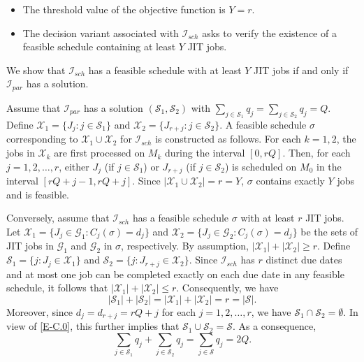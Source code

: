 \documentclass[12pt, eqno, limlimits]{article}
\begin{document}
\begin{sloppypar}
\begin{itemize}
            \item The threshold value of the objective function is $Y=r$.
            
            \item The decision variant associated with $\mathcal{I}_{sch}$ asks to verify the existence of a feasible schedule containing at least $Y$ JIT jobs.
        \end{itemize}
        
        We show that $\mathcal{I}_{sch}$ has a feasible schedule with at least $Y$ JIT jobs if and only if $\mathcal{I}_{par}$ has a solution.
        
        Assume that $\mathcal{I}_{par}$ has a solution $(\mathcal{S}_1, \mathcal{S}_2)$ with $\sum_{j \in \mathcal{S}_1} q_j = \sum_{j \in \mathcal{S}_2} q_j=Q$. Define $\mathcal{X}_1=\{J_j: j \in \mathcal{S}_1\}$ and $\mathcal{X}_2=\{J_{r+j}: j \in \mathcal{S}_2\}$. A feasible schedule $\sigma$ corresponding to $\mathcal{X}_1 \cup \mathcal{X}_2$ for $\mathcal{I}_{sch}$ is constructed as follows. For each $k=1, 2$, the jobs in $\mathcal{X}_k$ are first processed on $M_k$ during the  interval $[0, rQ]$. Then, for each $j=1, 2, \ldots, r$, either $J_j$ (if $j \in \mathcal{S}_1$) or $J_{r+j}$ (if $j \in \mathcal{S}_2$) is scheduled on $M_0$ in the interval $[rQ+j-1, rQ+j]$. Since $|\mathcal{X}_1 \cup \mathcal{X}_2|=r=Y$, $\sigma$ contains exactly $Y$ jobs and is feasible.
        
        Conversely, assume that $\mathcal{I}_{sch}$ has a feasible schedule $\sigma$ with at least $r$ JIT jobs. Let $\mathcal{X}_1=\{J_j \in \mathcal{G}_1: C_j(\sigma)=d_j\}$ and $\mathcal{X}_2=\{J_j \in \mathcal{G}_2: C_j(\sigma)=d_j\}$ be the sets of JIT jobs in $\mathcal{G}_1$ and $\mathcal{G}_2$ in $\sigma$, respectively. By assumption, $|\mathcal{X}_1|+|\mathcal{X}_2| \geq r$.
        Define $\mathcal{S}_1=\{j: J_j \in \mathcal{X}_1\}$ and $\mathcal{S}_2=\{j: J_{r+j} \in \mathcal{X}_2\}$. Since $\mathcal{I}_{sch}$ has $r$ distinct due dates and at most one job can be completed exactly on each due date in any feasible schedule, it follows that $|\mathcal{X}_1|+|\mathcal{X}_2| \leq r$. Consequently, we have 
        \begin{equation}\label{E-C.0}
            |\mathcal{S}_1|+|\mathcal{S}_2|=|\mathcal{X}_1|+|\mathcal{X}_2| =r= |\mathcal{S}|.
        \end{equation}
        Moreover, since $d_j=d_{r+j}=rQ+j$ for each $j=1, 2, \ldots, r$, we have $\mathcal{S}_1 \cap \mathcal{S}_2=\emptyset$. In view of \eqref{E-C.0}, this further implies that $\mathcal{S}_1 \cup \mathcal{S}_2=\mathcal{S}$.
        As a consequence,  
        \begin{equation}\label{E-C.1}
            \sum_{j \in \mathcal{S}_1} q_j + \sum_{j \in \mathcal{S}_2} q_j =\sum_{j \in \mathcal{S}} q_j=2Q.
        \end{equation}
        

\end{sloppypar}
\end{document}
